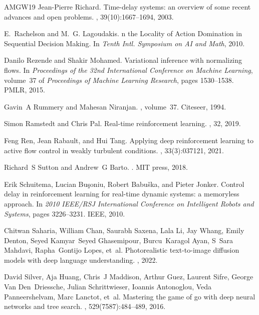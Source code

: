 \begin{thebibliography}{AMGW{\etalchar{+}}19}
Jean-Pierre Richard.
\newblock Time-delay systems: an overview of some recent advances and open problems.
, 39(10):1667--1694, 2003.

E.~Rachelson and M.~G. Lagoudakis.
n the {L}ocality of {A}ction {D}omination in {S}equential {D}ecision {M}aking.
\newblock In {\em Tenth Intl. Symposium on AI and Math}, 2010.

Danilo Rezende and Shakir Mohamed.
\newblock Variational inference with normalizing flows.
\newblock In {\em Proceedings of the 32nd International Conference on Machine Learning}, volume~37 of {\em Proceedings of Machine Learning Research}, pages 1530--1538. PMLR, 2015.

Gavin~A Rummery and Mahesan Niranjan.
, volume~37.
\newblock Citeseer, 1994.

Simon Ramstedt and Chris Pal.
\newblock Real-time reinforcement learning.
, 32, 2019.

Feng Ren, Jean Rabault, and Hui Tang.
\newblock Applying deep reinforcement learning to active flow control in weakly turbulent conditions.
, 33(3):037121, 2021.

Richard~S Sutton and Andrew~G Barto.
.
\newblock MIT press, 2018.

Erik Schuitema, Lucian Bu{\c{s}}oniu, Robert Babu{\v{s}}ka, and Pieter Jonker.
\newblock Control delay in reinforcement learning for real-time dynamic systems: a memoryless approach.
\newblock In {\em 2010 IEEE/RSJ International Conference on Intelligent Robots and Systems}, pages 3226--3231. IEEE, 2010.

Chitwan Saharia, William Chan, Saurabh Saxena, Lala Li, Jay Whang, Emily Denton, Seyed Kamyar~Seyed Ghasemipour, Burcu~Karagol Ayan, S~Sara Mahdavi, Rapha~Gontijo Lopes, et~al.
\newblock Photorealistic text-to-image diffusion models with deep language understanding.
, 2022.

David Silver, Aja Huang, Chris~J Maddison, Arthur Guez, Laurent Sifre, George Van Den~Driessche, Julian Schrittwieser, Ioannis Antonoglou, Veda Panneershelvam, Marc Lanctot, et~al.
\newblock Mastering the game of go with deep neural networks and tree search.
, 529(7587):484--489, 2016.


\end{thebibliography}
